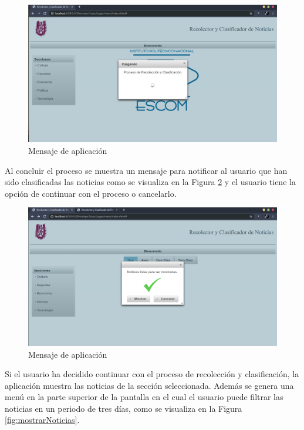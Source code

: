 \begin{figure}[ht]
\centering
\includegraphics[scale=0.3]{imagenes/Aplicacion/seleccionarSeccion.png}
\caption{Mensaje de aplicación}
\label{fig:seleccionarSeccion}
\end{figure}

Al concluir el proceso se muestra un mensaje para notificar al usuario
que han sido clasificadas las noticias como se visualiza en la Figura \ref{fig:noticiasListas} y el usuario tiene la opción de continuar con el proceso o cancelarlo.\\

\begin{figure}[ht]
\centering
\includegraphics[scale=0.3]{imagenes/Aplicacion/noticiasListas.png}
\caption{Mensaje de aplicación}
\label{fig:noticiasListas}
\end{figure}

Si el usuario ha decidido continuar con el proceso de recolección y clasificación, la aplicación muestra las noticias de la sección seleccionada. Además se genera una menú en la parte superior de la pantalla en el cual el usuario puede filtrar las noticias en un periodo de tres días, como se visualiza en la Figura \ref{fig:mostrarNoticias}.\\
 
